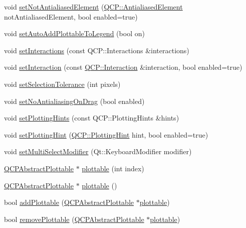 \begin{DoxyCompactItemize}
void \hyperlink{class_q_custom_plot_afc657938a707c890e449ae89203a076d}{set\+Not\+Antialiased\+Element} (\hyperlink{namespace_q_c_p_ae55dbe315d41fe80f29ba88100843a0c}{Q\+C\+P\+::\+Antialiased\+Element} not\+Antialiased\+Element, bool enabled=true)
\item 
void \hyperlink{class_q_custom_plot_ad8858410c2db47b7104040a3aa61c3fc}{set\+Auto\+Add\+Plottable\+To\+Legend} (bool on)
\item 
void \hyperlink{class_q_custom_plot_a5ee1e2f6ae27419deca53e75907c27e5}{set\+Interactions} (const Q\+C\+P\+::\+Interactions \&interactions)
\item 
void \hyperlink{class_q_custom_plot_a422bf1bc6d56dac75a3d805d9a65902c}{set\+Interaction} (const \hyperlink{namespace_q_c_p_a2ad6bb6281c7c2d593d4277b44c2b037}{Q\+C\+P\+::\+Interaction} \&interaction, bool enabled=true)
\item 
void \hyperlink{class_q_custom_plot_a4dc31241d7b09680950e19e5f971ed93}{set\+Selection\+Tolerance} (int pixels)
\item 
void \hyperlink{class_q_custom_plot_a775bdcb6329d44701aeaa6135b0e5265}{set\+No\+Antialiasing\+On\+Drag} (bool enabled)
\item 
void \hyperlink{class_q_custom_plot_a94a33cbdadbbac5934843508bcfc210d}{set\+Plotting\+Hints} (const Q\+C\+P\+::\+Plotting\+Hints \&hints)
\item 
void \hyperlink{class_q_custom_plot_a3b7c97bb6c16464e9e15190c07abe9a9}{set\+Plotting\+Hint} (\hyperlink{namespace_q_c_p_a5400e5fcb9528d92002ddb938c1f4ef4}{Q\+C\+P\+::\+Plotting\+Hint} hint, bool enabled=true)
\item 
void \hyperlink{class_q_custom_plot_a8fc96e3b5138a06759a2a90c166df516}{set\+Multi\+Select\+Modifier} (Qt\+::\+Keyboard\+Modifier modifier)
\item 
\hyperlink{class_q_c_p_abstract_plottable}{Q\+C\+P\+Abstract\+Plottable} $\ast$ \hyperlink{class_q_custom_plot_a32de81ff53e263e785b83b52ecd99d6f}{plottable} (int index)
\item 
\hyperlink{class_q_c_p_abstract_plottable}{Q\+C\+P\+Abstract\+Plottable} $\ast$ \hyperlink{class_q_custom_plot_adea38bdc660da9412ba69fb939031567}{plottable} ()
\item 
bool \hyperlink{class_q_custom_plot_ab7ad9174f701f9c6f64e378df77927a6}{add\+Plottable} (\hyperlink{class_q_c_p_abstract_plottable}{Q\+C\+P\+Abstract\+Plottable} $\ast$\hyperlink{class_q_custom_plot_a32de81ff53e263e785b83b52ecd99d6f}{plottable})
\item 
bool \hyperlink{class_q_custom_plot_af3dafd56884208474f311d6226513ab2}{remove\+Plottable} (\hyperlink{class_q_c_p_abstract_plottable}{Q\+C\+P\+Abstract\+Plottable} $\ast$\hyperlink{class_q_custom_plot_a32de81ff53e263e785b83b52ecd99d6f}{plottable})

\end{DoxyCompactItemize}
